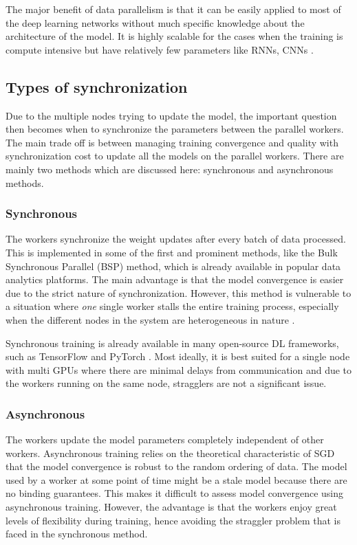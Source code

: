The major benefit of data parallelism is that it can be easily applied to most of the deep learning networks without much specific knowledge about the architecture of the model. It is highly scalable for the cases when the training is compute intensive but have relatively few parameters like RNNs, CNNs \cite{Krizhevsky2014OneNetworks}.


\subsection{Types of synchronization}
Due to the multiple nodes trying to update the model, the important question then becomes when to synchronize the parameters between the parallel workers. The main trade off is between managing training convergence and quality with synchronization cost to update all the models on the parallel workers. There are mainly two methods which are discussed here: synchronous and asynchronous methods.

\subsubsection{Synchronous}
The workers synchronize the weight updates after every batch of data processed. This is implemented in some of the first and prominent methods, like the Bulk Synchronous Parallel (BSP) \cite{Valiant1990AComputation} method, which is already available in popular data analytics platforms. The main advantage is that the model convergence is easier due to the strict nature of synchronization. However, this method is vulnerable to a situation where \emph{one} single worker stalls the entire training process, especially when the different nodes in the system are heterogeneous in nature \cite{CiparSolvingStaleness}.

Synchronous training is already available in many open-source DL frameworks, such
as TensorFlow \cite{AbadiTensorFlow:Systems} and PyTorch \cite{Paszke2019PyTorch:Library}. Most ideally, it is best suited for a single node with multi GPUs where there are minimal delays from communication and due to the workers running on the same node, stragglers are not a significant issue.

\subsubsection{Asynchronous}
The workers update the model parameters completely independent of other workers. Asynchronous training relies on the theoretical characteristic of SGD that the model convergence is robust to the random ordering of data. The model used by a worker at some point of time might be a stale model because there are no binding guarantees. This makes it difficult to assess model convergence using asynchronous training. However, the advantage is that the workers enjoy great levels of flexibility during training, hence avoiding the straggler problem that is faced in the synchronous method.

